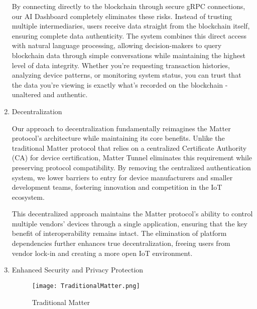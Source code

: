 \documentclass[conference]{IEEEtran}
\begin{document}
\begin{enumerate}[itemsep=2ex, parsep=1ex]
	      By connecting directly to the blockchain through secure gRPC connections, our AI Dashboard completely eliminates these risks. Instead of trusting multiple intermediaries, users receive data straight from the blockchain itself, ensuring complete data authenticity. The system combines this direct access with natural language processing, allowing decision-makers to query blockchain data through simple conversations while maintaining the highest level of data integrity. Whether you're requesting transaction histories, analyzing device patterns, or monitoring system status, you can trust that the data you're viewing is exactly what's recorded on the blockchain - unaltered and authentic.
	      
	      	      	      
	\item Decentralization
	      	      	      
	      Our approach to decentralization fundamentally reimagines the Matter
	      protocol's architecture while maintaining its core benefits. Unlike the traditional
	      Matter protocol that relies on a centralized Certificate Authority (CA) for
	      device certification, Matter Tunnel eliminates this requirement while
	      preserving protocol compatibility. By removing the centralized authentication
	      system, we lower barriers to entry for device manufacturers and smaller
	      development teams, fostering innovation and competition in the IoT ecosystem.
	      	      	      
	      This decentralized approach maintains the Matter protocol's ability to control
	      multiple vendors' devices through a single application, ensuring that the key
	      benefit of interoperability remains intact. The elimination of platform
	      dependencies further enhances true decentralization, freeing users from vendor
	      lock-in and creating a more open IoT environment.
	      	      
	      \vspace{3cm}
	      	      	      
	\item Enhanced Security and Privacy Protection
	      	      	      
	      \begin{figure}[h!]
	      	\centering
	      	\texttt{[image: TraditionalMatter.png]}
	      	\caption{Traditional Matter}
	      	\label{fig:TraditionalMatter}
	      \end{figure}
	      	      	      

\end{enumerate}
\end{document}
